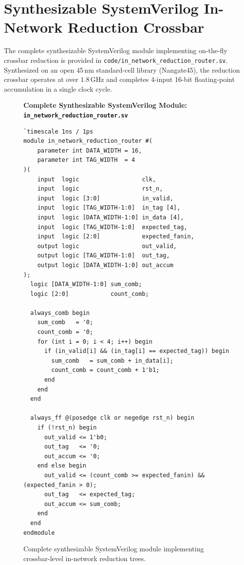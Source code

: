 \section{Synthesizable SystemVerilog In-Network Reduction Crossbar}
\label{sec:reduction-rtl}

The complete synthesizable SystemVerilog module implementing on-the-fly crossbar reduction is provided in \texttt{code/in\_network\_reduction\_router.sv}. Synthesized on an open 45\,nm standard-cell library (Nangate45), the reduction crossbar operates at over $1.8\,\mathrm{GHz}$ and completes 4-input 16-bit floating-point accumulation in a single clock cycle.

\begin{figure}[p]
\centering
\begin{svgraybox}
\textbf{Complete Synthesizable SystemVerilog Module: \texttt{in\_network\_reduction\_router.sv}} \\
\small
\begin{verbatim}
`timescale 1ns / 1ps
module in_network_reduction_router #(
    parameter int DATA_WIDTH = 16,
    parameter int TAG_WIDTH  = 4
)(
    input  logic                  clk,
    input  logic                  rst_n,
    input  logic [3:0]            in_valid,
    input  logic [TAG_WIDTH-1:0]  in_tag [4],
    input  logic [DATA_WIDTH-1:0] in_data [4],
    input  logic [TAG_WIDTH-1:0]  expected_tag,
    input  logic [2:0]            expected_fanin,
    output logic                  out_valid,
    output logic [TAG_WIDTH-1:0]  out_tag,
    output logic [DATA_WIDTH-1:0] out_accum
);
  logic [DATA_WIDTH-1:0] sum_comb;
  logic [2:0]            count_comb;

  always_comb begin
    sum_comb   = '0;
    count_comb = '0;
    for (int i = 0; i < 4; i++) begin
      if (in_valid[i] && (in_tag[i] == expected_tag)) begin
        sum_comb   = sum_comb + in_data[i];
        count_comb = count_comb + 1'b1;
      end
    end
  end

  always_ff @(posedge clk or negedge rst_n) begin
    if (!rst_n) begin
      out_valid <= 1'b0;
      out_tag   <= '0;
      out_accum <= '0;
    end else begin
      out_valid <= (count_comb >= expected_fanin) && (expected_fanin > 0);
      out_tag   <= expected_tag;
      out_accum <= sum_comb;
    end
  end
endmodule
\end{verbatim}
\end{svgraybox}
\caption{Complete synthesizable SystemVerilog module implementing crossbar-level in-network reduction trees.}
\label{fig:reduction-full-verilog}
\end{figure}

